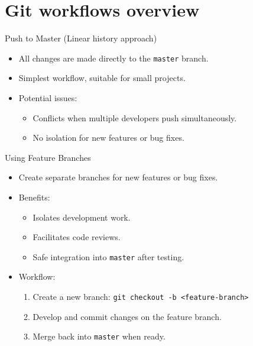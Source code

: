\documentclass{beamer}
\begin{document}
\section{Git workflows overview}

\begin{frame}{Push to Master (Linear history approach)}
  \begin{itemize}
      \item All changes are made directly to the \texttt{master} branch.
      \item Simplest workflow, suitable for small projects.
      \item Potential issues:
      \begin{itemize}
          \item Conflicts when multiple developers push simultaneously.
          \item No isolation for new features or bug fixes.
      \end{itemize}
  \end{itemize}
\end{frame}

\begin{frame}{Using Feature Branches}
  \begin{itemize}
      \item Create separate branches for new features or bug fixes.
      \item Benefits:
      \begin{itemize}
          \item Isolates development work.
          \item Facilitates code reviews.
          \item Safe integration into \texttt{master} after testing.
      \end{itemize}
      \item Workflow:
      \begin{enumerate}
          \item Create a new branch: \texttt{git checkout -b <feature-branch>}
          \item Develop and commit changes on the feature branch.
          \item Merge back into \texttt{master} when ready.
      \end{enumerate}
  \end{itemize}
\end{frame}
\end{document}
